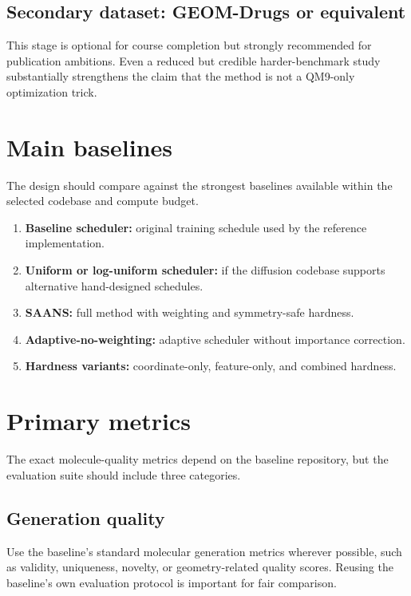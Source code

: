 \documentclass[11pt]{report}
\begin{document}
\subsection{Secondary dataset: GEOM-Drugs or equivalent}

This stage is optional for course completion but strongly recommended for publication ambitions. Even a reduced but credible harder-benchmark study substantially strengthens the claim that the method is not a QM9-only optimization trick.

\section{Main baselines}

The design should compare against the strongest baselines available within the selected codebase and compute budget.

\begin{enumerate}[leftmargin=2em]
    \item \textbf{Baseline scheduler:} original training schedule used by the reference implementation.
    \item \textbf{Uniform or log-uniform scheduler:} if the diffusion codebase supports alternative hand-designed schedules.
    \item \textbf{SAANS:} full method with weighting and symmetry-safe hardness.
    \item \textbf{Adaptive-no-weighting:} adaptive scheduler without importance correction.
    \item \textbf{Hardness variants:} coordinate-only, feature-only, and combined hardness.
\end{enumerate}

\section{Primary metrics}

The exact molecule-quality metrics depend on the baseline repository, but the evaluation suite should include three categories.

\subsection{Generation quality}

Use the baseline's standard molecular generation metrics wherever possible, such as validity, uniqueness, novelty, or geometry-related quality scores. Reusing the baseline's own evaluation protocol is important for fair comparison.
\end{document}
